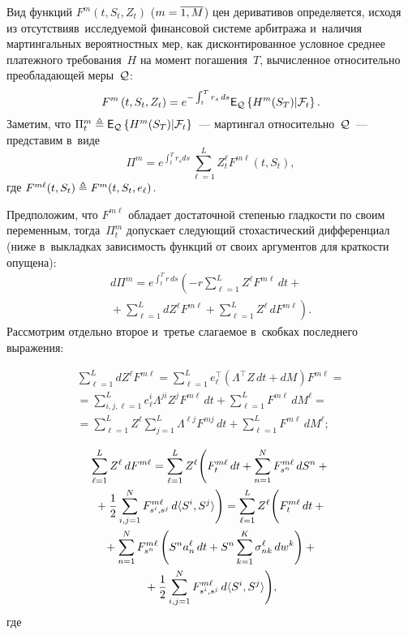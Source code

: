 \begin{multicols}{2}
Вид функций $F^m(t, S_t, Z_t)$ ($m\hm=\overline{1,M}$) цен деривативов определяется, исходя из отсутствия\linebreak в~исследуемой 
финансовой сис\-те\-ме арбитража и~наличия мартингальных вероятностных мер, как 
\mbox{дисконтированное} условное среднее платежного требования~$H$ на момент погашения~$T$, 
вычисленное относительно преобладающей меры~${\mathcal Q}$:
\begin{equation*}
F^m\left(t, S_t, Z_t\right) = e^{-\int\nolimits_t^T r_s\,ds}\mathsf{E}_{ {\mathcal Q} }\left\{ \mathop{H^m(S_T)|{\mathcal F}_t} \right\}.
\end{equation*}
Заметим, что $\Pi_t^m \triangleq \mathsf{E}_{ {\mathcal Q} }\left\{ \mathop{H^m(S_T)|{\mathcal F}_t} \right\}$~--- мартингал относительно~${\mathcal Q}$~--- представим в~виде
$$
\Pi^m = e^{\int\nolimits_t^T r_sds}\sum\limits_{\ell=1}^L Z_t^{\ell} F^{m\ell}(t, S_t),
$$
где $F^{m\ell}(t, S_t) \triangleq F^m(t, S_t, e_{\ell})$.

Предположим, что $F^{m\ell}$ обладает достаточной степенью гладкости по своим переменным, тогда~$\Pi_t^m$ 
допускает следующий стохастический дифференциал (ниже в~выкладках зависимость функций от своих аргументов для краткости опущена):
\begin{multline*}
d\Pi^m = e^{\int_t^T r\,ds} \left( -r \sum\limits_{\ell=1}^L Z^{\ell} F^{m\ell} \,dt +{}\right.\\
\left.{}+\sum\limits_{\ell=1}^L dZ^{\ell} F^{m\ell} +  \sum\limits_{\ell=1}^L Z^{\ell} \,dF^{m\ell} \right).
\end{multline*}
Рассмотрим отдельно второе и~третье слагаемое в~скобках последнего выражения:

\vspace*{-3pt}
\noindent
\begin{multline*}
\sum\limits_{\ell=1}^L dZ^{\ell} F^{m\ell} = \sum\limits_{\ell=1}^L e_{\ell}^{\top}\left( \Lambda^{\top}Z\,dt + dM\right) F^{m\ell} ={}\\
{}=
\sum\limits_{i,j,\ell=1}^L e_{\ell}^i  \Lambda^{ji}Z^{j} F^{m\ell} \,dt + \sum\limits_{\ell=1}^L F^{m\ell} \,dM^{\ell} ={} \\
{} =
\sum\limits_{\ell=1}^L Z^{\ell} \sum\limits_{j=1}^L \Lambda^{\ell j}F^{mj}\,dt + \sum\limits_{\ell=1}^L F^{m\ell} \,dM^{\ell};
\end{multline*}

\vspace*{-12pt}

\noindent
\begin{multline*}
\sum\limits_{\ell=1}^L Z^{\ell}\, dF^{m\ell} = \sum\limits_{\ell=1}^L Z^{\ell}
\Bigg(
F_t^{m\ell}\,dt + \sum\limits_{n=1}^N F_{s^n}^{m\ell} \,dS^n +{}\\
{}+ \displaystyle\frac{\displaystyle 1\mathstrut}{\displaystyle 2\mathstrut}  \sum\limits_{i,j=1}^N F_{s^i,s^j}^{m\ell}\, d\langle S^i,S^j \rangle \Bigg)
= 
\sum\limits_{\ell=1}^L Z^{\ell}\Bigg(
F_t^{m\ell}\,dt +{}\\
{}+ \sum\limits_{n=1}^NF_{s^n}^{m\ell}\left(
S^n a^{\ell}_n \,dt + S^n \sum\limits_{k=1}^K \sigma_{nk}^{\ell}\,dw^k
\right)
+{}\\
{}+
\displaystyle\frac{\displaystyle 1\mathstrut}{\displaystyle 2\mathstrut}  \sum\limits_{i,j=1}^N F_{s^i,s^j}^{m\ell}\,d \langle S^i,S^j \rangle
\Bigg),
\end{multline*}
где


\end{multicols}
